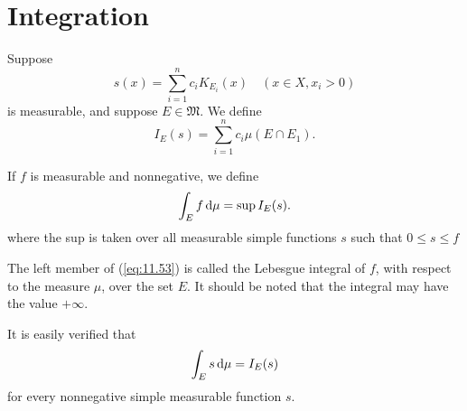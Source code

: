 
\section{Integration}

\begin{mydef}
    \label{mydef:11.21}
    Suppose 
    \begin{equation}
        \label{eq:11.51}
        s(x) = \sum_{i=1}^{n} c_i K_{E_i} (x) 
        \quad (x \in X, x_i > 0)
    \end{equation}
    is measurable, 
    and suppose $E \in \mathfrak{M}$.
    We define
    \begin{equation}
        \label{eq:11.52}
        I_E(s) = 
        \sum_{i=1}^{n} c_i \mu \left( E \cap E_1 \right) .
    \end{equation}

    If $f$ is measurable and nonnegative, 
    we define 
    \begin{equation}
        \label{eq:11.53}
        \int_E f \d \mu = 
        \sup I_E (s).
    \end{equation}
    where the sup is taken over all measurable simple functions $s$ such that $0 \leq s \leq f$
    
    The left member of (\ref{eq:11.53}) is called the Lebesgue integral of $f$, with respect to the measure $\mu$, over the set $E$. 
    It should be noted that the integral may have the value $+ \infty$. 
    
    It is easily verified that
    \begin{equation}
        \label{eq:11.54}
        \int_E s \d \mu =
        I_E (s)
    \end{equation}
    for every nonnegative simple measurable function $s$.
\end{mydef}


